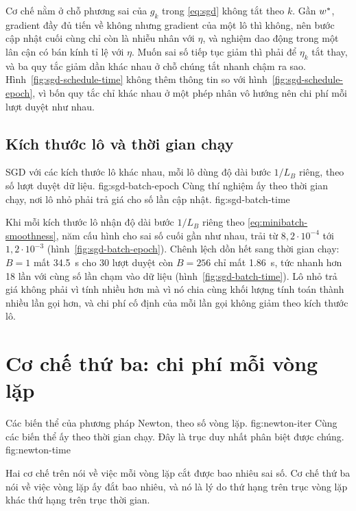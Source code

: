 Cơ chế nằm ở chỗ phương sai của $g_k$ trong \eqref{eq:sgd} không tắt theo $k$.
Gần $w^{*}$, gradient đầy đủ tiến về không nhưng gradient của một lô thì
không, nên bước cập nhật cuối cùng chỉ còn là nhiễu nhân với $\eta$, và nghiệm
dao động trong một lân cận có bán kính tỉ lệ với $\eta$. Muốn sai số tiếp tục
giảm thì phải để $\eta_k$ tắt thay, và ba quy tắc giảm dần khác nhau ở chỗ chúng
tắt nhanh chậm ra sao. Hình~\ref{fig:sgd-schedule-time} không thêm thông tin so
với hình~\ref{fig:sgd-schedule-epoch}, vì bốn quy tắc chỉ khác nhau ở một phép
nhân vô hướng nên chi phí mỗi lượt duyệt như nhau.

\subsection{Kích thước lô và thời gian chạy}
\label{sec:mech-batch}

  {SGD với các kích thước lô khác nhau, mỗi lô dùng độ dài bước $1/L_B$ riêng,
   theo số lượt duyệt dữ liệu.}
  {fig:sgd-batch-epoch}
  {Cùng thí nghiệm ấy theo thời gian chạy, nơi lô nhỏ phải trả giá cho số lần cập
   nhật.}
  {fig:sgd-batch-time}

Khi mỗi kích thước lô nhận độ dài bước $1/L_B$ riêng theo
\eqref{eq:minibatch-smoothness}, năm cấu hình cho sai số cuối gần như nhau, trải
từ $8{,}2 \cdot 10^{-4}$ tới $1{,}2 \cdot 10^{-3}$
(hình~\ref{fig:sgd-batch-epoch}). Chênh lệch dồn hết sang thời gian chạy:
$B = 1$ mất \SI{34.5}{\second} cho 30 lượt duyệt còn $B = 256$ chỉ mất
\SI{1.86}{\second}, tức nhanh hơn 18 lần với cùng số lần chạm vào dữ liệu
(hình~\ref{fig:sgd-batch-time}). Lô nhỏ trả giá không phải vì tính nhiều hơn mà
vì nó chia cùng khối lượng tính toán thành nhiều lần gọi hơn, và chi phí cố định
của mỗi lần gọi không giảm theo kích thước lô.

\section{Cơ chế thứ ba: chi phí mỗi vòng lặp}
\label{sec:mech-cost}

  {Các biến thể của phương pháp Newton, theo số vòng lặp.}
  {fig:newton-iter}
  {Cùng các biến thể ấy theo thời gian chạy. Đây là trục duy nhất phân biệt được
   chúng.}
  {fig:newton-time}

Hai cơ chế trên nói về việc mỗi vòng lặp cắt được bao nhiêu sai số. Cơ chế thứ ba
nói về việc vòng lặp ấy đắt bao nhiêu, và nó là lý do thứ hạng trên trục vòng lặp
khác thứ hạng trên trục thời gian.

